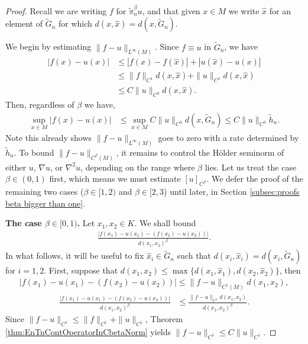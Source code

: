 \documentclass[11pt,reqno]{amsart}
\numberwithin{equation}{section}
\theoremstyle{plain}
\begin{document}
\begin{proof}
  Recall we are writing $f$ for $\tilde \pi_n^\beta u$, and that given $x\in M$ we write $\hat x$ for an element of $\tilde G_n$ for which $d(x,\hat x)=d(x,\tilde G_n)$. 
  
  We begin by estimating $\|f-u\|_{L^\infty(M)}$. Since $f\equiv u$ in $\tilde G_n$, we have
  \begin{align*}
    |f(x)-u(x)| & \leq |f(x)-f(\hat x)|+|u(\hat x)-u(x)|\\
      & \leq \|f\|_{C^1} d(x,\hat x)+\|u\|_{C^1}d(x,\hat x)\\
      & \leq C\|u\|_{C^3}d(x,\hat x).	
  \end{align*}
  Then, regardless of $\beta$ we have,
  \begin{align*}
    \sup \limits_{x \in M}|f(x)-u(x)| & \leq \sup\limits_{x\in M} C\|u\|_{C^3}d(x,\tilde G_n) \leq C\|u\|_{C^3}\tilde h_n.
  \end{align*}   
  Note this already shows $\|f-u\|_{L^\infty(M)}$ goes to zero with a rate determined by $\tilde h_n$.  To bound $\|f-u\|_{C^\beta(M)}$, it remains to control the H\"older seminorm of either $u$, $\nabla u$, or $\nabla^2  u$, depending on the range where $\beta$ lies. Let us treat the case $\beta \in (0,1)$ first, which means we must estimate $[u]_{C^\beta}$. We defer the proof of the remaining two cases ($\beta \in [1,2)$ and $\beta \in [2,3$) until later,  in Section \ref{subsec:proofs beta bigger than one}.
     
	 
  \textbf{The case $\beta \in [0,1)$.} Let $x_1,x_2\in K$. We shall bound
  \begin{align*}
    \frac{|f(x_1)-u(x_1)-(f(x_2)-u(x_2))|}{d(x_1,x_2)^\beta}.
  \end{align*}
  In what follows, it will be useful to fix $\hat x_i \in \tilde G_n$ such that $d(x_i,\hat x_i) = d(x_i,\tilde G_n)$ for $i=1,2$. First, suppose that $d(x_1,x_2) \leq \max \{d(x_1,\hat x_1),d(x_2,\hat x_2) \}$, then
  \begin{align*}
    |f(x_1)-u(x_1)-(f(x_2)-u(x_2))| \leq \|f-u\|_{C^1(M)}d(x_1,x_2),
  \end{align*}
  \begin{align*}
    \frac{|f(x_1)-u(x_1)-(f(x_2)-u(x_2))|}{d(x_1,x_2)^{\beta}} & \leq \frac{\|f-u\|_{C^1}d(x_1,x_2)}{d(x_1,x_2)^{\beta}}.
  \end{align*}	
  Since $\|f-u\|_{C^1} \leq \|f\|_{C^1}+\|u\|_{C^1}$,  Theorem \ref{thm:EnTnContOperatorInCbetaNorm} yields $\|f-u\|_{C^1} \leq C\|u\|_{C^1}$.


\end{proof}
\end{document}
